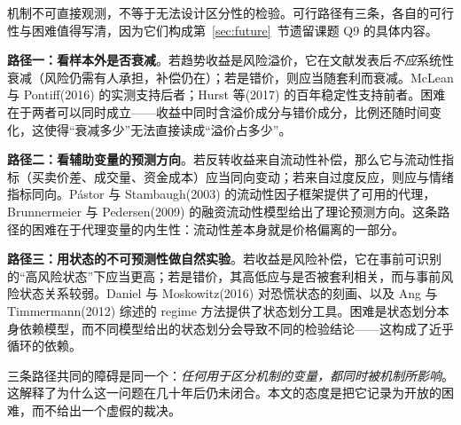 机制不可直接观测，不等于无法设计区分性的检验。可行路径有三条，各自的可行性与困难值得写清，因为它们构成第~\ref{sec:future}~节遗留课题 Q9 的具体内容。

\textbf{路径一：看样本外是否衰减}。若趋势收益是风险溢价，它在文献发表后\emph{不应}系统性衰减（风险仍需有人承担，补偿仍在）；若是错价，则应当随套利而衰减。McLean 与 Pontiff(2016) 的实测支持后者\cite{mcleanpontiff2016}；Hurst 等(2017) 的百年稳定性支持前者\cite{hop2017}。困难在于两者可以同时成立——收益中同时含溢价成分与错价成分，比例还随时间变化，这使得“衰减多少”无法直接读成“溢价占多少”。

\textbf{路径二：看辅助变量的预测方向}。若反转收益来自流动性补偿，那么它与流动性指标（买卖价差、成交量、资金成本）应当同向变动；若来自过度反应，则应与情绪指标同向。Pástor 与 Stambaugh(2003) 的流动性因子框架提供了可用的代理\cite{pastorstambaugh2003}，Brunnermeier 与 Pedersen(2009) 的融资流动性模型给出了理论预测方向\cite{brunnermeier2009}。这条路径的困难在于代理变量的内生性：流动性差本身就是价格偏离的一部分。

\textbf{路径三：用状态的不可预测性做自然实验}。若收益是风险补偿，它在事前可识别的“高风险状态”下应当更高；若是错价，其高低应与是否被套利相关，而与事前风险状态关系较弱。Daniel 与 Moskowitz(2016) 对恐慌状态的刻画、以及 Ang 与 Timmermann(2012) 综述的 regime 方法提供了状态划分工具\cite{danielmoskowitz2016,angtimmermann2012}。困难是状态划分本身依赖模型，而不同模型给出的状态划分会导致不同的检验结论——这构成了近乎循环的依赖。

三条路径共同的障碍是同一个：\emph{任何用于区分机制的变量，都同时被机制所影响}。这解释了为什么这一问题在几十年后仍未闭合。本文的态度是把它记录为开放的困难，而不给出一个虚假的裁决。
